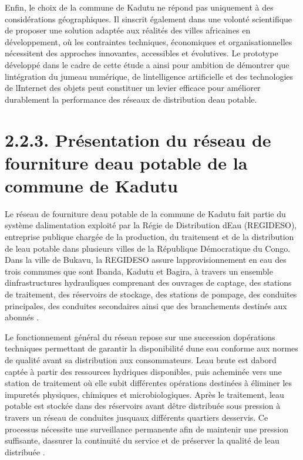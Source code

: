 \documentclass[12pt,a4paper,oneside]{report}
\begin{document}
Enfin, le choix de la commune de Kadutu ne répond pas uniquement à des
considérations géographiques. Il s\textquotesingle inscrit également
dans une volonté scientifique de proposer une solution adaptée aux
réalités des villes africaines en développement, où les contraintes
techniques, économiques et organisationnelles nécessitent des approches
innovantes, accessibles et évolutives. Le prototype développé dans le
cadre de cette étude a ainsi pour ambition de démontrer que
l\textquotesingle intégration du jumeau numérique, de
l\textquotesingle intelligence artificielle et des technologies de
l\textquotesingle Internet des objets peut constituer un levier efficace
pour améliorer durablement la performance des réseaux de distribution
d\textquotesingle eau potable.

\section{\texorpdfstring{\textbf{2.2.3. Présentation du réseau de
fourniture d\textquotesingle eau potable de la commune de
Kadutu}}{2.2.3. Présentation du réseau de fourniture d\textquotesingle eau potable de la commune de Kadutu}}\label{pruxe9sentation-du-ruxe9seau-de-fourniture-deau-potable-de-la-commune-de-kadutu}

Le réseau de fourniture d\textquotesingle eau potable de la commune de
Kadutu fait partie du système d\textquotesingle alimentation exploité
par la Régie de Distribution d\textquotesingle Eau (REGIDESO),
entreprise publique chargée de la production, du traitement et de la
distribution de l\textquotesingle eau potable dans plusieurs villes de
la République Démocratique du Congo. Dans la ville de Bukavu, la
REGIDESO assure l\textquotesingle approvisionnement en eau des trois
communes que sont Ibanda, Kadutu et Bagira, à travers un ensemble
d\textquotesingle infrastructures hydrauliques comprenant des ouvrages
de captage, des stations de traitement, des réservoirs de stockage, des
stations de pompage, des conduites principales, des conduites
secondaires ainsi que des branchements destinés aux abonnés \cite{ref86}.

Le fonctionnement général du réseau repose sur une succession
d\textquotesingle opérations techniques permettant de garantir la
disponibilité d\textquotesingle une eau conforme aux normes de qualité
avant sa distribution aux consommateurs. L\textquotesingle eau brute est
d\textquotesingle abord captée à partir des ressources hydriques
disponibles, puis acheminée vers une station de traitement où elle subit
différentes opérations destinées à éliminer les impuretés physiques,
chimiques et microbiologiques. Après le traitement,
l\textquotesingle eau potable est stockée dans des réservoirs avant
d\textquotesingle être distribuée sous pression à travers un réseau de
conduites jusqu\textquotesingle aux différents quartiers desservis. Ce
processus nécessite une surveillance permanente afin de maintenir une
pression suffisante, d\textquotesingle assurer la continuité du service
et de préserver la qualité de l\textquotesingle eau distribuée \cite{ref4}.
\end{document}
